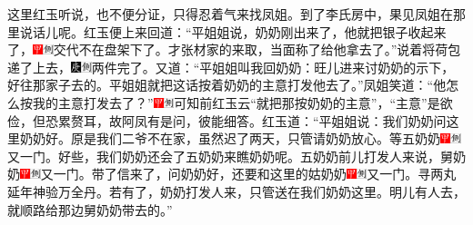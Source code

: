 这里红玉听说，也不便分证，只得忍着气来找凤姐。到了李氏房中，果见凤姐在那里说话儿呢。红玉便上来回道：“平姐姐说，奶奶刚出来了，他就把银子收起来了，{\includegraphics[width=3mm]{../Images/00002}\includegraphics[width=3mm]{../Images/00011}\footnotesize \kaishu 交代不在盘架下了。}才张材家的来取，当面称了给他拿去了。”说着将荷包递了上去，{\includegraphics[width=3mm]{../Images/00004}\includegraphics[width=3mm]{../Images/00011}\footnotesize \kaishu 两件完了。}又道：“平姐姐叫我回奶奶：旺儿进来讨奶奶的示下，好往那家子去的。平姐姐就把这话按着奶奶的主意打发他去了。”凤姐笑道：“他怎么按我的主意打发去了？”{\includegraphics[width=3mm]{../Images/00002}\includegraphics[width=3mm]{../Images/00011}\footnotesize \kaishu 可知前红玉云“就把那按奶奶的主意”，“主意”是欲俭，但恐累赘耳，故阿凤有是问，彼能细答。}红玉道：“平姐姐说：我们奶奶问这里奶奶好。原是我们二爷不在家，虽然迟了两天，只管请奶奶放心。等五奶奶{\includegraphics[width=3mm]{../Images/00002}\includegraphics[width=3mm]{../Images/00011}\footnotesize \kaishu 又一门。}好些，我们奶奶还会了五奶奶来瞧奶奶呢。五奶奶前儿打发人来说，舅奶奶{\includegraphics[width=3mm]{../Images/00002}\includegraphics[width=3mm]{../Images/00011}\footnotesize \kaishu 又一门。}带了信来了，问奶奶好，还要和这里的姑奶奶{\includegraphics[width=3mm]{../Images/00002}\includegraphics[width=3mm]{../Images/00011}\footnotesize \kaishu 又一门。}寻两丸延年神验万全丹。若有了，奶奶打发人来，只管送在我们奶奶这里。明儿有人去，就顺路给那边舅奶奶带去的。”

